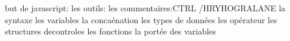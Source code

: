 but de javascript:
les outils:
les commentaires:CTRL /HRYHOGRALANE
la syntaxe
les variables
la concaénation
les types de données
les opérateur
les structures decontroles
les fonctions
la portée des variables